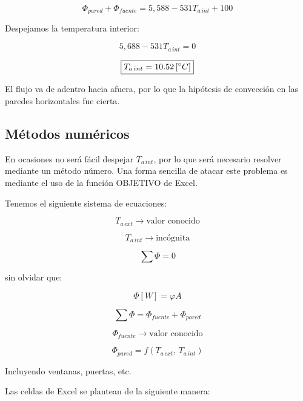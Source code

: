 \documentclass[11pt]{article}
\begin{document}
\[ \Phi _{ pared } + \Phi _{ fuente } = 5,588 -531 T_{ a \, int } + 100 \]

Despejamos la temperatura interior: 

\[ 5,688 - 531 T_{ a \, int } = 0 \]

\[ \boxed{
    T_{ a \, int } = 10.52 \left[ \degree C \right]
} \]

El flujo va de adentro hacia afuera, por lo que la hipótesis de convección en las paredes horizontales fue cierta.

\subsection*{Métodos numéricos}

En ocasiones no será fácil despejar $ T_{ a \, int} $, por lo que será necesario resolver mediante un método número. Una forma sencilla de atacar este problema es mediante el uso de la función OBJETIVO de Excel.

Tenemos el siguiente sistema de ecuaciones:

\[ T_{ a \, ext } \longrightarrow \text{valor conocido} \]

\[ T_{ a \, int } \longrightarrow \text{incógnita} \]

\[ \sum{ \Phi } = 0 \]

sin olvidar que:

\[ \Phi \left[ W \right] = \varphi A \]

\[ \sum{ \Phi } = \Phi _{ fuente } + \Phi _{ pared } \]

\[ \Phi _{ fuente } \longrightarrow \text{valor conocido} \]

\[ \Phi _{ pared } = f \left( T_{ a \, ext }, \, T_{ a \, int } \right) \]

Incluyendo ventanas, puertas, etc.

Las celdas de Excel se plantean de la siguiente manera:
\end{document}
